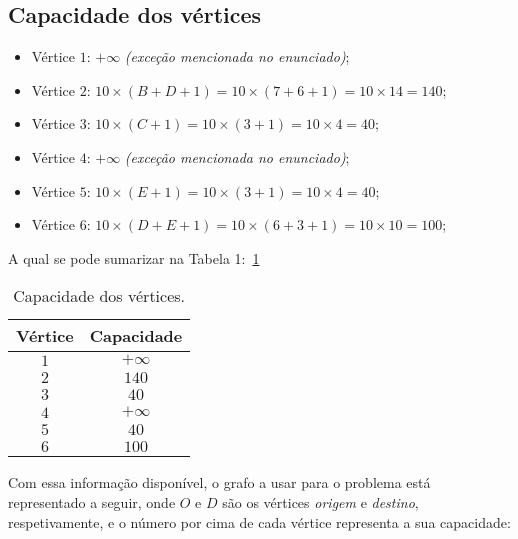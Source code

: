 \documentclass[a4paper,12pt]{article}
\begin{document}
\subsection*{Capacidade dos vértices}
\begin{itemize}
    \item Vértice $1$: $+\infty$ \textit{(exceção mencionada no enunciado)};
    \item Vértice $2$: $10 \times (B + D + 1) = 10 \times (7 + 6 + 1) = 10 \times 14 = 140$;
    \item Vértice $3$: $10 \times (C + 1) = 10 \times (3 + 1) = 10 \times 4 = 40$;
    \item Vértice $4$: $+\infty$ \textit{(exceção mencionada no enunciado)};
    \item Vértice $5$: $10 \times (E + 1) = 10 \times (3 + 1) = 10 \times 4 = 40$;
    \item Vértice $6$: $10 \times (D + E + 1) = 10 \times (6 + 3 + 1) = 10 \times 10 = 100$;
\end{itemize}

A qual se pode sumarizar na Tabela 1:~\ref{tab:capacidades}

\begin{table}[h!]
\centering
\label{tab:capacidades}
\begin{tabular}{@{}c c@{}}
\toprule
\textbf{Vértice} & \textbf{Capacidade} \\
\midrule
$1$ & $+\infty$ \\
$2$ & $140$       \\
$3$ & $40$       \\
$4$ & $+\infty$       \\
$5$ & $40$       \\
$6$ & $100$       \\
\bottomrule
\end{tabular}
\caption{Capacidade dos vértices.}
\end{table}

Com essa informação disponível, o grafo a usar para o problema está representado a seguir, onde $O$ e $D$ são os vértices \textit{origem} e \textit{destino}, respetivamente, e o número por cima de cada vértice representa a sua capacidade:
\end{document}
